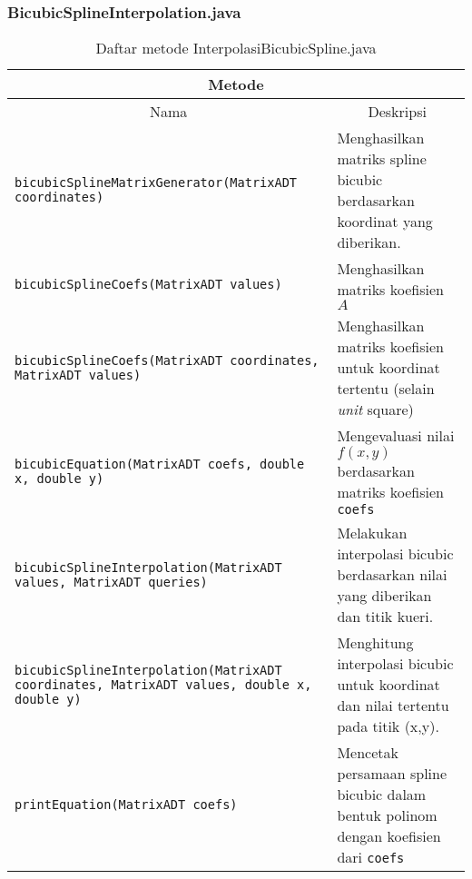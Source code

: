 \subsubsection{BicubicSplineInterpolation.java}

\begin{table}[H]
    \centering
    \caption{Daftar metode InterpolasiBicubicSpline.java}
        \begin{tabular}{p{}|p{}}
        \hline
        \hline
        \multicolumn{2}{c}{\textbf{Metode}}\\
        \hline
        \hline
         \multicolumn{1}{c|}{Nama}  & \multicolumn{1}{c}{Deskripsi} \\
         \hline 
         \hline 
         \texttt{bicubicSplineMatrixGenerator(MatrixADT coordinates)} & Menghasilkan matriks spline bicubic berdasarkan koordinat yang diberikan. \\[.5em]
         \texttt{bicubicSplineCoefs(MatrixADT values)} & Menghasilkan matriks koefisien $A$  \\[.5em]
         \texttt{bicubicSplineCoefs(MatrixADT coordinates, MatrixADT values)} & Menghasilkan matriks koefisien untuk koordinat tertentu (selain \textit{unit} square) \\[.5em]
         \texttt{bicubicEquation(MatrixADT coefs, double x, double y)} & Mengevaluasi nilai $f(x, y)$ berdasarkan matriks koefisien \verb+coefs+ \\[.5em]
         \texttt{bicubicSplineInterpolation(MatrixADT values, MatrixADT queries)} & Melakukan interpolasi bicubic berdasarkan nilai yang diberikan dan titik kueri.  \\[.5em]
         \texttt{bicubicSplineInterpolation(MatrixADT coordinates, MatrixADT values, double x, double y)} & Menghitung interpolasi bicubic untuk koordinat dan nilai tertentu pada titik (x,y). \\[.5em]
         \texttt{printEquation(MatrixADT coefs)} &  Mencetak persamaan spline bicubic dalam bentuk polinom dengan koefisien dari \verb+coefs+
    \end{tabular}
\end{table}



